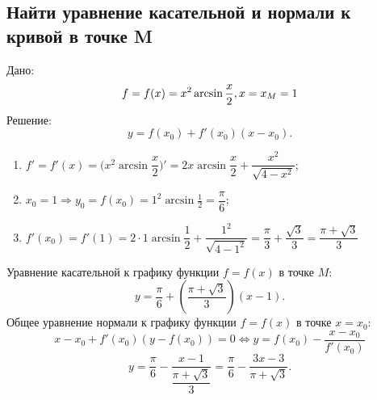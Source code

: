 \documentclass{article}
\newcommand{\mysection}[3]{\setcounter{section}{#1}\setcounter{subsection}{#2}\addtocounter{subsection}{-1}\subsection{#3}}
\begin{document}
\clearpage
\mysection{3}{9}{Найти уравнение касательной и нормали к кривой в точке M}
Дано:
\begin{equation*}
f = f(x) = x^2\arcsin{\frac x 2}, \\
x=x_M=1
\end{equation*}
Решение:
\begin{equation*}
    y = f(x_0) + f'(x_0)(x-x_0).
\end{equation*}
\begin{enumerate}
    \item $f' = f'(x) = \Big(x^2\arcsin{\dfrac x 2}\Big)' = 2x\arcsin{\dfrac x 2} + \dfrac{x^2}{\sqrt{4-x^2}}$;
    \item $x_0 = 1 \Rightarrow y_0 = f(x_0) =1^2\arcsin{\frac 1 2} = \dfrac{\pi}{6}$;
    \item $f'(x_0) = f'(1) = 2 \cdot 1\arcsin{\dfrac{1}{2}} + \dfrac{1^2}{\sqrt{4-1^2}} = 
    \dfrac{\pi}{3} + \dfrac{\sqrt{3}}{3} = \dfrac{\pi + \sqrt{3}}{3}$
\end{enumerate}
Уравнение касательной к графику функции $f=f(x)$ в точке $M$:
\begin{equation*}
    y = \dfrac \pi 6 + (\dfrac{\pi + \sqrt{3}}{3})(x-1).
\end{equation*}
Общее уравнение нормали к графику функции $f=f(x)$ в точке $x=x_0$:
\begin{equation*}
    x-x_0+f'(x_0)(y-f(x_0))=0 \Leftrightarrow y = f(x_0) - \dfrac{x-x_0}{f'(x_0)}
\end{equation*}
\begin{equation*}
    y=\dfrac{\pi}{6} - \dfrac{x-1}{\dfrac{\pi + \sqrt{3}}{3}} = \dfrac{\pi}{6} - \dfrac{3x-3}{\pi + \sqrt{3}}.
\end{equation*}
\end{document}
